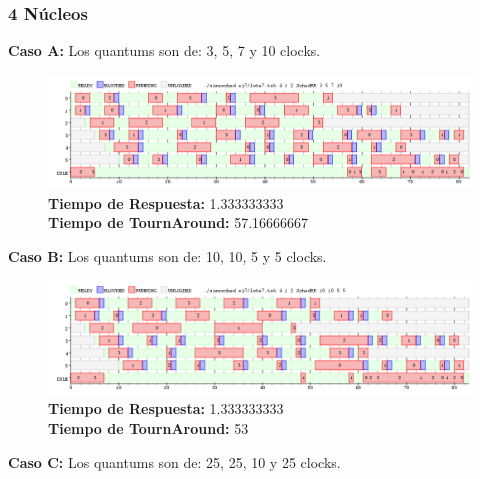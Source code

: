 \documentclass[a4paper]{article}
\begin{document}
 \newpage
	\subsubsection*{4 N\'ucleos}
	
	\textbf{Caso A:}  Los quantums son de: 3, 5, 7 y 10 clocks.
	
		 \begin{figure}[h!]
   \begin{center}
 	\includegraphics[scale=0.5]{imagenes/ej7/4nucleoA.png}
 	\textbf{Tiempo de Respuesta:} 1.333333333 \\
 	\textbf{Tiempo de TournAround:} 57.16666667 \\
   \end{center}
 \end{figure} 
 	
	\textbf{Caso B:}  Los quantums son de: 10, 10, 5 y 5 clocks.
	
			 \begin{figure}[h!]
   \begin{center}
 	\includegraphics[scale=0.5]{imagenes/ej7/4nucleoB.png}
 	\textbf{Tiempo de Respuesta:} 1.333333333 \\
 	\textbf{Tiempo de TournAround:} 53 \\
   \end{center}
 \end{figure} 
 
	\textbf{Caso C:}  Los quantums son de: 25, 25, 10 y 25 clocks.
	
\end{document}
